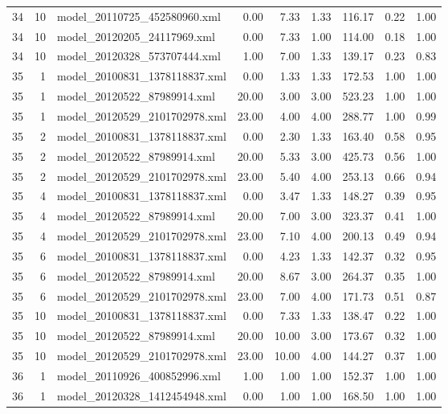 \begin{table}[ht]
\begin{tabular}{rrlrrrrrr}
   34 &  10 & model\_20110725\_452580960.xml & 0.00 & 7.33 & 1.33 & 116.17 & 0.22 & 1.00 \\ 
   34 &  10 & model\_20120205\_24117969.xml & 0.00 & 7.33 & 1.00 & 114.00 & 0.18 & 1.00 \\ 
   34 &  10 & model\_20120328\_573707444.xml & 1.00 & 7.00 & 1.33 & 139.17 & 0.23 & 0.83 \\ 
   35 &   1 & model\_20100831\_1378118837.xml & 0.00 & 1.33 & 1.33 & 172.53 & 1.00 & 1.00 \\ 
   35 &   1 & model\_20120522\_87989914.xml & 20.00 & 3.00 & 3.00 & 523.23 & 1.00 & 1.00 \\ 
   35 &   1 & model\_20120529\_2101702978.xml & 23.00 & 4.00 & 4.00 & 288.77 & 1.00 & 0.99 \\ 
   35 &   2 & model\_20100831\_1378118837.xml & 0.00 & 2.30 & 1.33 & 163.40 & 0.58 & 0.95 \\ 
   35 &   2 & model\_20120522\_87989914.xml & 20.00 & 5.33 & 3.00 & 425.73 & 0.56 & 1.00 \\ 
   35 &   2 & model\_20120529\_2101702978.xml & 23.00 & 5.40 & 4.00 & 253.13 & 0.66 & 0.94 \\ 
   35 &   4 & model\_20100831\_1378118837.xml & 0.00 & 3.47 & 1.33 & 148.27 & 0.39 & 0.95 \\ 
   35 &   4 & model\_20120522\_87989914.xml & 20.00 & 7.00 & 3.00 & 323.37 & 0.41 & 1.00 \\ 
   35 &   4 & model\_20120529\_2101702978.xml & 23.00 & 7.10 & 4.00 & 200.13 & 0.49 & 0.94 \\ 
   35 &   6 & model\_20100831\_1378118837.xml & 0.00 & 4.23 & 1.33 & 142.37 & 0.32 & 0.95 \\ 
   35 &   6 & model\_20120522\_87989914.xml & 20.00 & 8.67 & 3.00 & 264.37 & 0.35 & 1.00 \\ 
   35 &   6 & model\_20120529\_2101702978.xml & 23.00 & 7.00 & 4.00 & 171.73 & 0.51 & 0.87 \\ 
   35 &  10 & model\_20100831\_1378118837.xml & 0.00 & 7.33 & 1.33 & 138.47 & 0.22 & 1.00 \\ 
   35 &  10 & model\_20120522\_87989914.xml & 20.00 & 10.00 & 3.00 & 173.67 & 0.32 & 1.00 \\ 
   35 &  10 & model\_20120529\_2101702978.xml & 23.00 & 10.00 & 4.00 & 144.27 & 0.37 & 1.00 \\ 
   36 &   1 & model\_20110926\_400852996.xml & 1.00 & 1.00 & 1.00 & 152.37 & 1.00 & 1.00 \\ 
   36 &   1 & model\_20120328\_1412454948.xml & 0.00 & 1.00 & 1.00 & 168.50 & 1.00 & 1.00 \\ 

\end{tabular}
\end{table}
